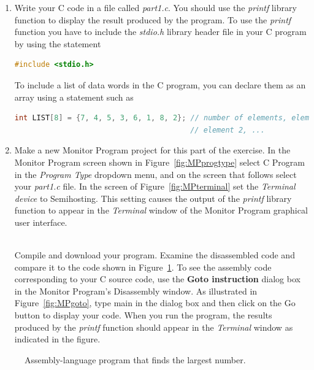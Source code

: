 \documentclass[epsfig,10pt,fullpage]{article}
\begin{document}
\begin{enumerate}
\item
Write your C code in a file called {\it part1.c}.  You should use the {\it printf}
library function to display the result produced by the program. To use the {\it printf} function 
you have to include the {\it stdio.h} library header file in your C program by using the statement

\begin{lstlisting}[language=C]
#include <stdio.h>
\end{lstlisting}

\noindent
To include a list of data words in the C program, you can declare them as an array using
a statement such as

\begin{lstlisting}[language=C]
int LIST[8] = {7, 4, 5, 3, 6, 1, 8, 2}; // number of elements, element 1,
                                        // element 2, ...
\end{lstlisting}

\item
Make a new Monitor Program project for 
this part of the exercise. In the Monitor Program screen shown in
Figure~\ref{fig:MPprogtype} select {\sf C Program} in the {\it Program Type}
dropdown menu, and on the screen that follows select your {\it part1.c} file. In the screen of 
Figure~\ref{fig:MPterminal} set the {\it Terminal device} to {\sf Semihosting}.
This setting causes the output of the {\it printf} library function to appear 
in the {\it Terminal} window of the Monitor Program graphical user interface.

~\\
\noindent
Compile and download your program. Examine the disassembled code and compare it
to the code shown in Figure~\ref{fig:code}. To see the assembly code corresponding to your 
C source code, use the {\bf Goto instruction} dialog box in the Monitor Program's Disassembly
window. As illustrated in Figure~\ref{fig:MPgoto}, type {\sf main} in the dialog box and then 
click on the {\sf Go} button to display your code. When you run the program, the results
produced by the {\it printf} function should appear in the {\it Terminal} window as indicated 
in the figure.

\end{enumerate}

\begin{figure}[H]
\begin{center}

\end{center}
\caption{Assembly-language program that finds the largest number.}
\label{fig:code}
\end{figure}
\end{document}
